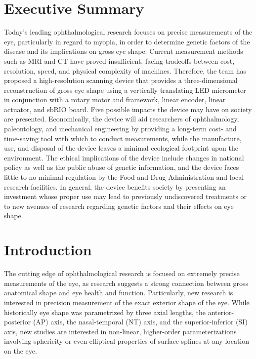 \documentclass{article}
\begin{document}
 
 
\setcounter{tocdepth}{2}
\tableofcontents
\newpage
\listoftables
\listoffigures
\newpage
 
 
\section*{Executive Summary}
\label{sec:exec-summary}
 
Today's leading ophthalmological research focuses on precise
measurements of the eye, particularly in regard to myopia,
in order to determine genetic factors of the disease and its
implications on gross eye shape. Current measurement
methods such as MRI and CT have proved insufficient, facing
tradeoffs between cost, resolution, speed, and physical complexity of
machines. Therefore, the team has proposed a high-resolution
scanning device that provides a three-dimensional reconstruction of gross eye
shape using a vertically translating LED micrometer in
conjunction with a rotary motor and framework, linear
encoder, linear actuator, and sbRIO board.
Five possible impacts the device may
have on society are presented. Economically, the device
will aid
researchers of ophthalmology, paleontology, and mechanical
engineering by providing a long-term cost- and time-saving tool with
which to conduct measurements, while the manufacture, use, and
disposal of the device leaves a minimal ecological footprint
upon the environment. The ethical implications of the device include changes in
national policy as well as the public abuse of genetic information,
and the device faces little to no minimal regulation by the Food and Drug
Administration and local research facilities. In general, the device benefits society by presenting an investment whose proper use
may lead to previously undiscovered treatments or to new avenues of research regarding genetic factors and their effects on eye shape. 


\newpage
 
 
\section{Introduction}
\label{sec:Introduction}
 
The cutting edge of ophthalmological research is focused on extremely
precise measurements of the eye, as research suggests a strong
connection between gross anatomical shape and eye health and
function. Particularly, new research is interested in precision
measurement of the exact exterior shape of the
eye\cite{atchison04,zhou99:genes,zhou99:models,guggenheim04,wallman04}. While
historically eye shape was parametrized by three axial lengths, the
anterior-posterior (AP) axis, the nasal-temporal (NT) axis, and the
superior-inferior (SI) axis, new studies are interested in non-linear,
higher-order parameterizations involving sphericity or even elliptical
properties of surface splines at any location on the eye.
 
\end{document}
